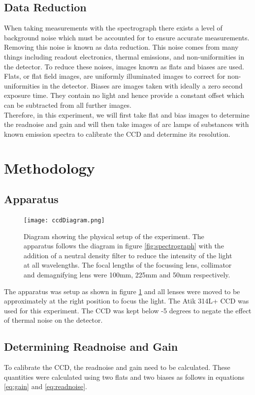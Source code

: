\documentclass[a4paper,12pt,twocolumn]{article}
\let\cite=\supercite
\begin{document}
		\subsection{Data Reduction}
			When taking measurements with the spectrograph there exists a level of background noise which must be accounted for to ensure accurate measurements. Removing this noise is known as data reduction\cite{manual}. This noise comes from many things including readout electronics, thermal emissions, and non-uniformities in the detector\cite{astropy}. To reduce these noises, images known as flats and biases are used. Flats, or flat field images, are uniformly illuminated images to correct for non-uniformities in the detector. Biases are images taken with ideally a zero second exposure time. They contain no light and hence provide a constant offset which can be subtracted from all further images.\\
			
		Therefore, in this experiment, we will first take flat and bias images to determine the readnoise and gain and will then take images of arc lamps of substances with known emission spectra to calibrate the CCD and determine its resolution.
	
	\section{Methodology}
		\subsection{Apparatus}
			\begin{figure}
				\texttt{[image: ccdDiagram.png]}
				\captionsetup{font=scriptsize}
				\caption{Diagram showing the physical setup of the experiment\cite{manual}. The apparatus follows the diagram in figure \ref{fig:spectrograph} with the addition of a neutral density filter to reduce the intensity of the light at all wavelengths. The focal lengths of the focussing lens, collimator and demagnifying lens were 100mm, 225mm and 50mm respectively.}
				\label{fig:apparatus}
			\end{figure}
		
			The apparatus was setup as shown in figure \ref{fig:apparatus} and all lenses were moved to be approximately at the right position to focus the light. The Atik 314L+ CCD was used for this experiment. The CCD was kept below -5 degrees to negate the effect of thermal noise on the detector.
	
		\subsection{Determining Readnoise and Gain}
			To calibrate the CCD, the readnoise and gain need to be calculated. These quantities were calculated using two flats and two biases as follows in equations \ref{eq:gain} and \ref{eq:readnoise}\cite{manual}.
			
\end{document}
